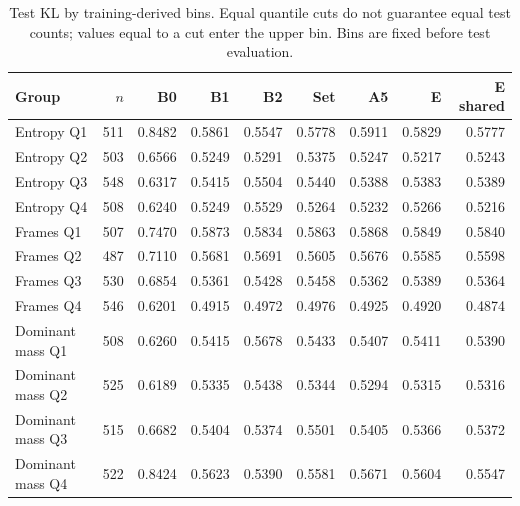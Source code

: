 \begin{table}[!htbp]
\centering
\footnotesize
\setlength{\tabcolsep}{5pt}
\begin{tabular}{lrrrrrrrr}
\toprule
Group & $n$ & B0 & B1 & B2 & Set & A5 & E & E shared \\
\midrule
Entropy Q1 & 511 & 0.8482 & 0.5861 & 0.5547 & 0.5778 & 0.5911 & 0.5829 & 0.5777 \\
Entropy Q2 & 503 & 0.6566 & 0.5249 & 0.5291 & 0.5375 & 0.5247 & 0.5217 & 0.5243 \\
Entropy Q3 & 548 & 0.6317 & 0.5415 & 0.5504 & 0.5440 & 0.5388 & 0.5383 & 0.5389 \\
Entropy Q4 & 508 & 0.6240 & 0.5249 & 0.5529 & 0.5264 & 0.5232 & 0.5266 & 0.5216 \\
Frames Q1 & 507 & 0.7470 & 0.5873 & 0.5834 & 0.5863 & 0.5868 & 0.5849 & 0.5840 \\
Frames Q2 & 487 & 0.7110 & 0.5681 & 0.5691 & 0.5605 & 0.5676 & 0.5585 & 0.5598 \\
Frames Q3 & 530 & 0.6854 & 0.5361 & 0.5428 & 0.5458 & 0.5362 & 0.5389 & 0.5364 \\
Frames Q4 & 546 & 0.6201 & 0.4915 & 0.4972 & 0.4976 & 0.4925 & 0.4920 & 0.4874 \\
Dominant mass Q1 & 508 & 0.6260 & 0.5415 & 0.5678 & 0.5433 & 0.5407 & 0.5411 & 0.5390 \\
Dominant mass Q2 & 525 & 0.6189 & 0.5335 & 0.5438 & 0.5344 & 0.5294 & 0.5315 & 0.5316 \\
Dominant mass Q3 & 515 & 0.6682 & 0.5404 & 0.5374 & 0.5501 & 0.5405 & 0.5366 & 0.5372 \\
Dominant mass Q4 & 522 & 0.8424 & 0.5623 & 0.5390 & 0.5581 & 0.5671 & 0.5604 & 0.5547 \\
\bottomrule
\end{tabular}
\caption{Test KL by training-derived bins. Equal quantile cuts do not guarantee equal test counts; values equal to a cut enter the upper bin. Bins are fixed before test evaluation.}
\label{tab:strata}
\end{table}
